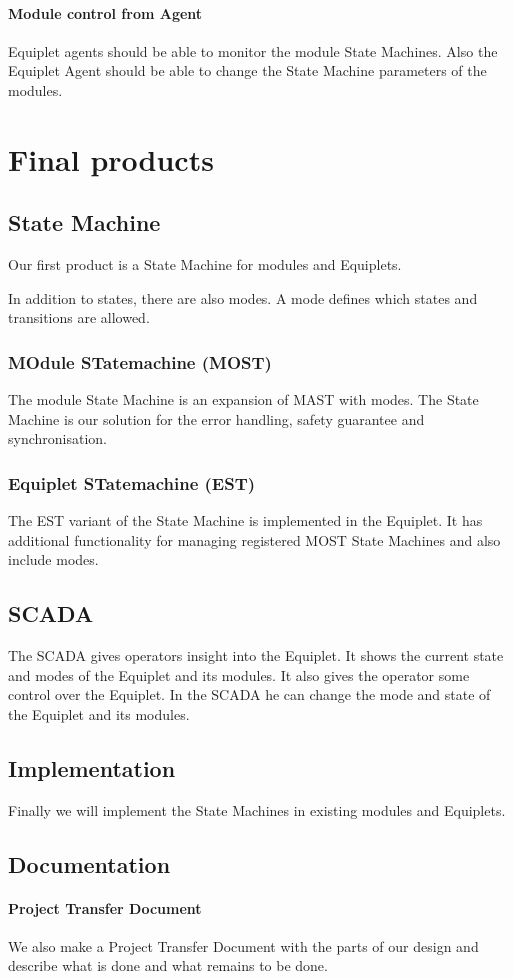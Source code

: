 \paragraph{Module control from Agent} Equiplet agents should be able to monitor the module State Machines. Also the Equiplet Agent should be able to change the State Machine parameters of the modules.

\newpage
\section{Final products}
\subsection{State Machine}
Our first product is a State Machine for modules and Equiplets. 

In addition to states, there are also modes.
A mode defines which states and transitions are allowed.

\subsubsection{MOdule STatemachine (MOST)}
The module State Machine is an expansion of MAST with modes.
The State Machine is our solution for the error handling, safety guarantee and synchronisation.

\subsubsection{Equiplet STatemachine (EST)}
The EST variant of the State Machine is implemented in the Equiplet.
It has additional functionality for managing registered MOST State Machines and also include modes.

\subsection{SCADA}
The SCADA gives operators insight into the Equiplet.
It shows the current state and modes of the Equiplet and its modules.
It also gives the operator some control over the Equiplet.
In the SCADA he can change the mode and state of the Equiplet and its modules.

\subsection{Implementation}
Finally we will implement the State Machines in existing modules and Equiplets.

\subsection{Documentation}
\paragraph{Project Transfer Document}We also make a Project Transfer Document with the parts of our design and describe what is done and what remains to be done.